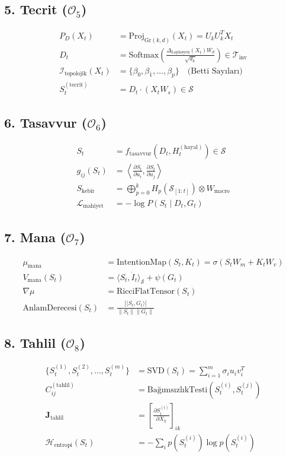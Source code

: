 \documentclass[11pt, a4paper]{article}
\begin{document}
\subsection{5. Tecrit ($\mathcal{O}_5$)}
\begin{align}
P_D(X_t) &= \text{Proj}_{\text{Gr}(k,d)}\left( X_t \right) = U_k U_k^T X_t \\
D_t &= \text{Softmax}\left( \frac{\Delta_{\text{Laplasyen}}(X_t) W_d}{\sqrt{d_k}} \right) \in \mathcal{T}_{\text{inv}} \\
\mathcal{I}_{\text{topolojik}}(X_t) &= \{ \beta_0, \beta_1, \dots, \beta_p \} \quad \text{(Betti Sayıları)} \\
S_t^{(\text{tecrit})} &= D_t \cdot (X_t W_s) \in \mathcal{S}
\end{align}

\subsection{6. Tasavvur ($\mathcal{O}_6$)}
\begin{align}
S_t &= f_{\text{tasavvur}}(D_t, H_t^{(\text{hayal})}) \in \mathcal{S} \\
g_{ij}(S_t) &= \left\langle \frac{\partial S_t}{\partial u_i}, \frac{\partial S_t}{\partial u_j} \right\rangle \\
S_{\text{kebîr}} &= \bigoplus_{p=0}^k H_p\left(\mathcal{S}_{[1:t]}\right) \otimes W_{\text{macro}} \\
\mathcal{L}_{\text{mahiyet}} &= -\log P(S_t \mid D_t, G_t)
\end{align}

\subsection{7. Mana ($\mathcal{O}_7$)}
\begin{align}
\mu_{\text{mana}} &= \text{IntentionMap}(S_t, K_t) = \sigma(S_t W_m + K_t W_v) \\
V_{\text{mana}}(S_t) &= \langle S_t, \dot{I}_t \rangle_{\mathcal{S}} + \psi(G_t) \\
\nabla \mu &= \text{RicciFlatTensor}(S_t) \\
\text{AnlamDerecesi}(S_t) &= \frac{|\langle S_t, G_t \rangle|}{\|S_t\| \|G_t\|}
\end{align}

\subsection{8. Tahlil ($\mathcal{O}_8$)}
\begin{align}
\{S_t^{(1)}, S_t^{(2)}, \dots, S_t^{(m)}\} &= \text{SVD}(S_t) = \sum_{i=1}^m \sigma_i u_i v_i^T \\
C_{ij}^{(\text{tahlil})} &= \text{BağımsızlıkTesti}(S_t^{(i)}, S_t^{(j)}) \\
\mathbf{J}_{\text{tahlil}} &= \left[ \frac{\partial S_t^{(i)}}{\partial X_k} \right]_{ik} \\
\mathcal{H}_{\text{entropi}}(S_t) &= -\sum_{i} p(S_t^{(i)}) \log p(S_t^{(i)})
\end{align}
\end{document}
